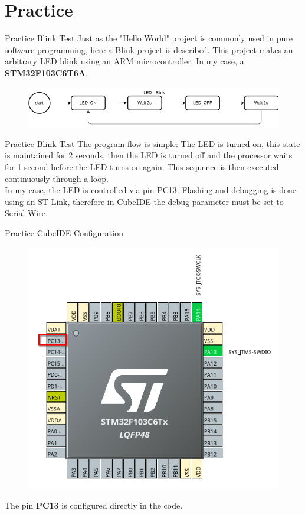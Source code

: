 \documentclass{beamer}
\begin{document}
\section{Practice}
\begin{frame}{Practice}
	{Blink Test}
	Just as the "Hello World" project is commonly used in pure software programming, here a Blink project is described. This project makes an arbitrary LED blink using an ARM microcontroller. In my case, a \textbf{STM32F103C6T6A}.
	\begin{figure}
		\centering
		\includegraphics[width=\linewidth]{LED_Blink_Flow.png}
	\end{figure}
\end{frame}
\begin{frame}{Practice}
	{Blink Test}
	The program flow is simple: The LED is turned on, this state is maintained for 2 seconds, then the LED is turned off and the processor waits for 1 second before the LED turns on again. This sequence is then executed continuously through a loop.\\ 
	\vspace{0.2cm}
	In my case, the LED is controlled via pin PC13. Flashing and debugging is done using an ST-Link, therefore in CubeIDE the debug parameter must be set to Serial Wire.
\end{frame}
\begin{frame}{Practice}
	{CubeIDE Configuration}
	\begin{figure}
		\includegraphics[width=.6\linewidth]{Blink_001.png}
	\end{figure}
	The pin \textbf{PC13} is configured directly in the code.
\end{frame}
\end{document}
